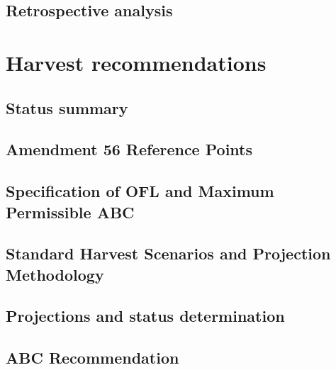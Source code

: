 \documentclass[11pt,]{article}
\begin{document}
\hypertarget{retrospective-analysis}{%
\subsection{Retrospective analysis}\label{retrospective-analysis}}

\hypertarget{harvest-recommendations}{%
\section{Harvest recommendations}\label{harvest-recommendations}}

\hypertarget{status-summary}{%
\subsection{Status summary}\label{status-summary}}

\hypertarget{amendment-56-reference-points}{%
\subsection{Amendment 56 Reference
Points}\label{amendment-56-reference-points}}

\hypertarget{specification-of-ofl-and-maximum-permissible-abc}{%
\subsection{Specification of OFL and Maximum Permissible
ABC}\label{specification-of-ofl-and-maximum-permissible-abc}}

\hypertarget{standard-harvest-scenarios-and-projection-methodology}{%
\subsection{Standard Harvest Scenarios and Projection
Methodology}\label{standard-harvest-scenarios-and-projection-methodology}}

\hypertarget{projections-and-status-determination}{%
\subsection{Projections and status
determination}\label{projections-and-status-determination}}

\hypertarget{abc-recommendation}{%
\subsection{ABC Recommendation}\label{abc-recommendation}}
\end{document}
